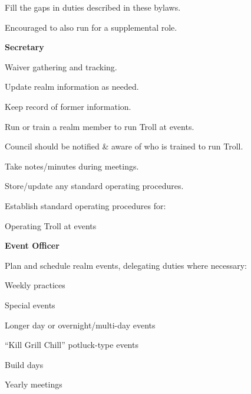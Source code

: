 \documentclass[12pt]{article}
\begin{document}
\begin{level}
\begin{level}
\begin{level}
            \item Fill the gaps in duties described in these bylaws.
            \item Encouraged to also run for a supplemental role.
        \end{level}
        \item \textbf{Secretary}
        \begin{level}
            \item Waiver gathering and tracking.
            \item Update realm information as needed.
            \item Keep record of former information.
            \item Run or train a realm member to run Troll at events.
            \begin{level}
                \item Council should be notified \& aware of who is trained to run Troll.
            \end{level}
            \item Take notes/minutes during meetings.
            \item Store/update any standard operating procedures.
            \item Establish standard operating procedures for:
            \begin{level}
                \item Operating Troll at events
            \end{level}
        \end{level}
        \item \textbf{Event Officer}
        \begin{level}
            \item Plan and schedule realm events, delegating duties where necessary:
            \begin{level}
                \item Weekly practices
                \item Special events
                \begin{level}
                    \item Longer day or overnight/multi-day events
                    \item “Kill Grill Chill” potluck-type events
                \end{level}
                \item Build days
                \item Yearly meetings

\end{level}
\end{level}
\end{level}
\end{level}
\end{document}
